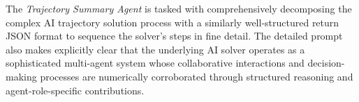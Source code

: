 \begin{center}
\end{center}

The \textit{Trajectory Summary Agent} is tasked with comprehensively decomposing the complex AI trajectory solution process with a similarly well-structured return JSON format to sequence the solver's steps in fine detail. The detailed prompt also makes explicitly clear that the underlying AI solver operates as a sophisticated multi-agent system whose collaborative interactions and decision-making processes are numerically corroborated through structured reasoning and agent-role-specific contributions.





